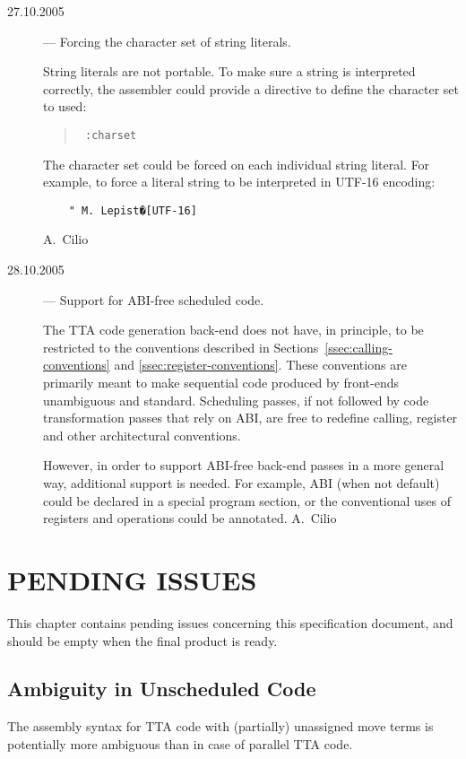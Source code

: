 \documentclass[twoside]{tce}
\begin{document}
\begin{description}
\item[27.10.2005] --- Forcing the character set of string literals.

  String literals are not portable. To make sure a string is interpreted
  correctly, the assembler could provide a directive to define the character
  set to used:
  \begin{quote}\tt
    :charset 
  \end{quote}

  The character set could be forced on each individual string literal. For
  example, to force a literal string to be interpreted in UTF-16 encoding:
  \begin{verbatim}
    " M. Lepist�[UTF-16]
  \end{verbatim}
%
  A.~Cilio

\item[28.10.2005] --- Support for ABI-free scheduled code.

  The TTA code generation back-end does not have, in principle, to be
  restricted to the conventions described in
  Sections~\ref{ssec:calling-conventions} and
  \ref{ssec:register-conventions}. These conventions are primarily meant to
  make sequential code produced by front-ends unambiguous and standard.
  Scheduling passes, if not followed by code transformation passes that rely
  on ABI, are free to redefine calling, register and other architectural
  conventions.

  However, in order to support ABI-free back-end passes in a more general
  way, additional support is needed. For example, ABI (when not default)
  could be declared in a special program section, or the conventional uses
  of registers and operations could be annotated.
%
  A.~Cilio
\end{description}



\chapter{PENDING ISSUES}

This chapter contains pending issues concerning this specification document,
and should be empty when the final product is ready.

\section{Ambiguity in Unscheduled Code}
\label{ch:pending:disambiguation}

The assembly syntax for TTA code with (partially) unassigned move terms is
potentially more ambiguous than in case of parallel TTA code.
\end{document}
